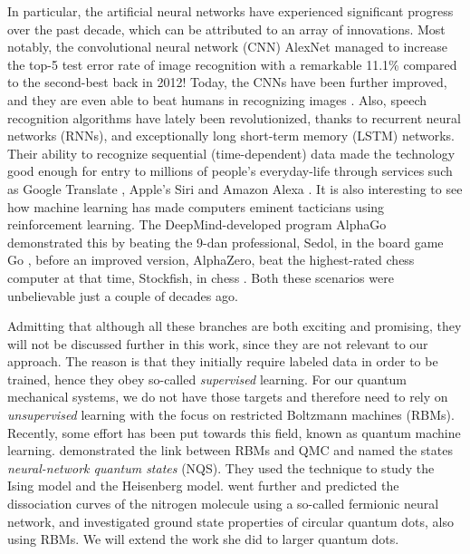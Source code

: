 In particular, the artificial neural networks have experienced significant progress over the past decade, which can be attributed to an array of innovations. Most notably, the convolutional neural network (CNN) AlexNet \supercite{krizhevsky_imagenet_2012} managed to increase the top-5 test error rate of image recognition with a remarkable 11.1\% compared to the second-best back in 2012! Today, the CNNs have been further improved, and they are even able to beat humans in recognizing images \supercite{alom_history_2018}. Also, speech recognition algorithms have lately been revolutionized, thanks to recurrent neural networks (RNNs), and exceptionally long short-term memory (LSTM) networks. Their ability to recognize sequential (time-dependent) data made the technology good enough for entry to millions of people's everyday-life through services such as Google Translate \supercite{wu_googles_2016}, Apple's Siri \supercite{smith_ios_2016} and Amazon Alexa \supercite{noauthor_bringing_nodate}. It is also interesting to see how machine learning has made computers eminent tacticians using reinforcement learning. The DeepMind-developed program AlphaGo demonstrated this by beating the 9-dan professional, Sedol, in the board game Go \supercite{silver2016mastering}, before an improved version, AlphaZero, beat the highest-rated chess computer at that time, Stockfish, in chess \supercite{silver2017mastering}. Both these scenarios were unbelievable just a couple of decades ago.

Admitting that although all these branches are both exciting and promising, they will not be discussed further in this work, since they are not relevant to our approach. The reason is that they initially require labeled data in order to be trained, hence they obey so-called \textit{supervised} learning. For our quantum mechanical systems, we do not have those targets and therefore need to rely on \textit{unsupervised} learning with the focus on restricted Boltzmann machines (RBMs). Recently, some effort has been put towards this field, known as quantum machine learning. \citet{carleo_solving_2017} demonstrated the link between RBMs and QMC and named the states \textit{neural-network quantum states} (NQS). They used the technique to study the Ising model and the Heisenberg model. \citet{pfau2019abinitio} went further and predicted the dissociation curves of the nitrogen molecule using a so-called fermionic neural network, and \citet{flugsrud_vilde_moe_solving_nodate} investigated ground state properties of circular quantum dots, also using RBMs. We will extend the work she did to larger quantum dots.

